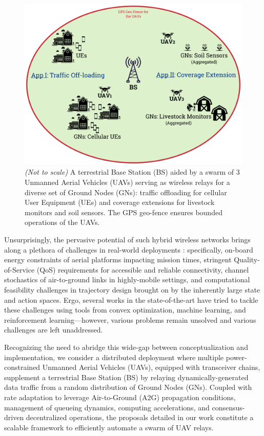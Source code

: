\documentclass[12pt, draftcls, onecolumn]{IEEEtran}
\theoremstyle{plain}
\theoremstyle{definition}
\theoremstyle{remark}
\begin{document}
\begin{figure} [t]
    \centering
    \includegraphics[width=0.7\linewidth]{figs/System_Architecture_I.png}
    \caption{\emph{(Not to scale)} A terrestrial Base Station (BS) aided by a swarm of $3$ Unmanned Aerial Vehicles (UAVs) serving as wireless relays for a diverse set of Ground Nodes (GNs): traffic offloading for cellular User Equipment (UEs) and coverage extensions for livestock monitors and soil sensors. The GPS geo-fence ensures bounded operations of the UAVs.}
    \vspace{-10mm}
    \label{F1}
\end{figure}

Unsurprisingly, the pervasive potential of such hybrid wireless networks brings along a plethora of challenges in real-world deployments \cite{FundamentalTradeoffs}: specifically, on-board energy constraints of aerial platforms impacting mission times, stringent Quality-of-Service (QoS) requirements for accessible and reliable connectivity, channel stochastics of air-to-ground links in highly-mobile settings, and computational feasibility challenges in trajectory design brought on by the inherently large state and action spaces. Ergo, several works in the state-of-the-art have tried to tackle these challenges using tools from convex optimization, machine learning, and reinforcement learning---however, various problems remain unsolved and various challenges are left unaddressed. 

Recognizing the need to abridge this wide-gap between conceptualization and implementation, we consider a distributed deployment where multiple power-constrained Unmanned Aerial Vehicles (UAVs), equipped with transceiver chains, supplement a terrestrial Base Station (BS) by relaying dynamically-generated data traffic from a random distribution of Ground Nodes (GNs). Coupled with rate adaptation to leverage Air-to-Ground (A2G) propagation conditions, management of queueing dynamics, computing accelerations, and consensus-driven decentralized operations, the proposals detailed in our work constitute a scalable framework to efficiently automate a swarm of UAV relays.
\end{document}
